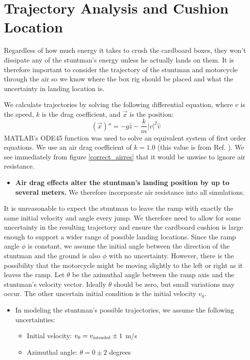 \documentclass[12pt,a4paper,titlepage]{article}
\begin{document}
\section{Trajectory Analysis and Cushion Location}

Regardless of how much energy it takes to crush the cardboard boxes, they won't dissipate any of
the stuntman's energy unless he actually lands on them.  It is therefore important to consider
the trajectory of the stuntman and motorcycle through the air so we know where the box rig
should be placed and what the uncertainty in landing location is.

We calculate trajectories by solving the following  differential equation, where $v$ is
the speed, $k$ is the drag coefficient, and $\vec{x}$ is the position:
$$
(\vec{x})'' = -g\hat{z} - \frac{k}{m}|v|^{2}\hat{v}
$$
MATLAB's ODE45 function was used to solve an equivalent system of first order equations.  We use an air
drag coefficient of $k=1.0$ (this value is from Ref. \cite{drag}).  We see immediately from figure
\ref{correct_airres} that it would be unwise to ignore air resistance.
\begin{itemize}
\item {\bf Air drag effects alter the stuntman's landing position by up to several meters.}
We therefore incorporate air resistance into all simulations.
\end{itemize}

It is unreasonable to expect the stuntman to leave the ramp with exactly the same initial velocity and angle
every jump.  We therefore need to allow for some uncertainty in the resulting trajectory and ensure the
cardboard cushion is large enough to support a wider range of possible landing locations.  Since the ramp
angle $\phi$ is constant, we assume the initial angle between the direction of the stuntman and the ground
is also $\phi$ with no uncertainty.  However, there is the possibility that the motorcycle might be moving
slightly to the left or right as it leaves the ramp.   Let $\theta$ be the azimuthal angle between the ramp
axis and the stuntman's velocity vector.  Ideally $\theta$ should be zero, but small variations may occur.
The other uncertain initial condition is the initial velocity $v_{0}$.
\begin{itemize}
\item In modeling the stuntman's possible trajectories, we assume the following uncertainties:
\begin{itemize}
\item Initial velocity: $v_{0} = v_{\scalebox{0.7}{\hbox{intended}}} \pm 1$ m/s
\item Azimuthal angle: $\theta = 0 \pm 2$ degrees
\end{itemize}
\end{itemize}
\end{document}
